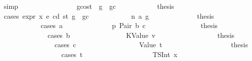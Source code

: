 \begin{isabellebody}
\ simp\isanewline
\ \ \ \ \ \ \isamarkupfalse%
\isanewline
\ \ \ \ \ \ \ \ \isamarkupfalse%
\ gcost{\isacharcolon}{\kern0pt}\ {\isachardoublequoteopen}{\isasymnot}\ g\ {\isasymle}\ gc{\isachardoublequoteclose}\isanewline
\ \ \ \ \ \ \ \ \isamarkupfalse%
\ \isamarkupfalse%
\ {\isacharquery}{\kern0pt}thesis\isanewline
\ \ \ \ \ \ \ \ \isamarkupfalse%
\ {\isacharparenleft}{\kern0pt}cases\ {\isachardoublequoteopen}expr\ x\ e\ cd\ st\ {\isacharparenleft}{\kern0pt}g\ {\isacharminus}{\kern0pt}\ gc{\isacharparenright}{\kern0pt}{\isachardoublequoteclose}{\isacharparenright}{\kern0pt}\isanewline
\ \ \ \ \ \ \ \ \ \ \isamarkupfalse%
\ {\isacharparenleft}{\kern0pt}n\ a\ g{\isacharprime}{\kern0pt}{\isacharparenright}{\kern0pt}\isanewline
\ \ \ \ \ \ \ \ \ \ \isamarkupfalse%
\ \isamarkupfalse%
\ {\isacharquery}{\kern0pt}thesis\isanewline
\ \ \ \ \ \ \ \ \ \ \isamarkupfalse%
\ {\isacharparenleft}{\kern0pt}cases\ a{\isacharparenright}{\kern0pt}\isanewline
\ \ \ \ \ \ \ \ \ \ \ \ \isamarkupfalse%
\ p{}{\isacharcolon}{\kern0pt}\ {\isacharparenleft}{\kern0pt}Pair\ b\ c{\isacharparenright}{\kern0pt}\isanewline
\ \ \ \ \ \ \ \ \ \ \ \ \isamarkupfalse%
\ \isamarkupfalse%
\ {\isacharquery}{\kern0pt}thesis\isanewline
\ \ \ \ \ \ \ \ \ \ \ \ \isamarkupfalse%
\ {\isacharparenleft}{\kern0pt}cases\ b{\isacharparenright}{\kern0pt}\isanewline
\ \ \ \ \ \ \ \ \ \ \ \ \ \ \isamarkupfalse%
\ {\isacharparenleft}{\kern0pt}KValue\ v{\isacharparenright}{\kern0pt}\isanewline
\ \ \ \ \ \ \ \ \ \ \ \ \ \ \isamarkupfalse%
\ \isamarkupfalse%
\ {\isacharquery}{\kern0pt}thesis\isanewline
\ \ \ \ \ \ \ \ \ \ \ \ \ \ \isamarkupfalse%
\ {\isacharparenleft}{\kern0pt}cases\ c{\isacharparenright}{\kern0pt}\isanewline
\ \ \ \ \ \ \ \ \ \ \ \ \ \ \ \ \isamarkupfalse%
\ {\isacharparenleft}{\kern0pt}Value\ t{\isacharparenright}{\kern0pt}\isanewline
\ \ \ \ \ \ \ \ \ \ \ \ \ \ \ \ \isamarkupfalse%
\ \isamarkupfalse%
\ {\isacharquery}{\kern0pt}thesis\isanewline
\ \ \ \ \ \ \ \ \ \ \ \ \ \ \ \ \isamarkupfalse%
\ {\isacharparenleft}{\kern0pt}cases\ t{\isacharparenright}{\kern0pt}\isanewline
\ \ \ \ \ \ \ \ \ \ \ \ \ \ \ \ \ \ \isamarkupfalse%
\ {\isacharparenleft}{\kern0pt}TSInt\ x{}{\isacharparenright}{\kern0pt}\isanewline

\end{isabellebody}
